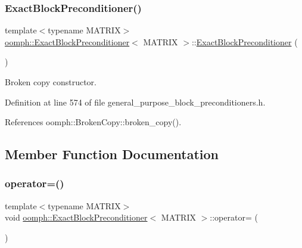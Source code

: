 \subsubsection{\texorpdfstring{Exact\+Block\+Preconditioner()}{ExactBlockPreconditioner()}\hspace{0.1cm}{\footnotesize\ttfamily [2/2]}}
{\footnotesize\ttfamily template$<$typename M\+A\+T\+R\+IX$>$ \\
\hyperlink{classoomph_1_1ExactBlockPreconditioner}{oomph\+::\+Exact\+Block\+Preconditioner}$<$ M\+A\+T\+R\+IX $>$\+::\hyperlink{classoomph_1_1ExactBlockPreconditioner}{Exact\+Block\+Preconditioner} (\begin{DoxyParamCaption}\item[{const \hyperlink{classoomph_1_1ExactBlockPreconditioner}{Exact\+Block\+Preconditioner}$<$ M\+A\+T\+R\+IX $>$ \&}]{ }\end{DoxyParamCaption})\hspace{0.3cm}{\ttfamily [inline]}}



Broken copy constructor. 



Definition at line 574 of file general\+\_\+purpose\+\_\+block\+\_\+preconditioners.\+h.



References oomph\+::\+Broken\+Copy\+::broken\+\_\+copy().



\subsection{Member Function Documentation}
\mbox{\label{classoomph_1_1ExactBlockPreconditioner_ae8d338c08e792ec8c49af72d5941f198}} 
\subsubsection{\texorpdfstring{operator=()}{operator=()}}
{\footnotesize\ttfamily template$<$typename M\+A\+T\+R\+IX$>$ \\
void \hyperlink{classoomph_1_1ExactBlockPreconditioner}{oomph\+::\+Exact\+Block\+Preconditioner}$<$ M\+A\+T\+R\+IX $>$\+::operator= (\begin{DoxyParamCaption}\item[{const \hyperlink{classoomph_1_1ExactBlockPreconditioner}{Exact\+Block\+Preconditioner}$<$ M\+A\+T\+R\+IX $>$ \&}]{ }\end{DoxyParamCaption})\hspace{0.3cm}{\ttfamily [inline]}}




